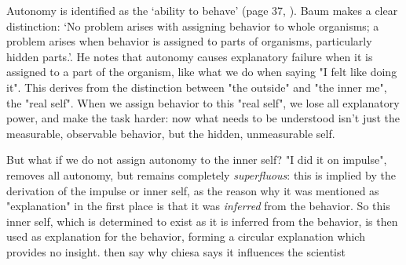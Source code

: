\documentclass[letterpaper,11pt,twocolumn]{article}
\begin{document}
Autonomy is identified as the \enquote*{ability to behave} (page 37, \cite{baumUnderstandingBehaviorismBehavior2017}). Baum makes a clear distinction: \enquote*{No problem arises with assigning behavior to whole organisms; a problem arises when behavior is assigned to parts of organisms, particularly hidden parts.}. He notes that autonomy causes explanatory failure when it is assigned to a part of the organism, like what we do when saying "I felt like doing it". This derives from the distinction between "the outside" and "the inner me", the "real self". When we assign behavior to this "real self", we lose all explanatory power, and make the task harder: now what needs to be understood isn't just the measurable, observable behavior, but the hidden, unmeasurable self.

But what if we do not assign autonomy to the inner self? "I did it on impulse", removes all autonomy, but remains completely \textit{superfluous}: this is implied by the derivation of the impulse or inner self, as the reason why it was mentioned as "explanation" in the first place is that it was \textit{inferred} from the behavior. So this inner self, which is determined to exist as it is inferred from the behavior, is then used as explanation for the behavior, forming a circular explanation which provides no insight.
then say why chiesa says it influences the scientist
\end{document}
